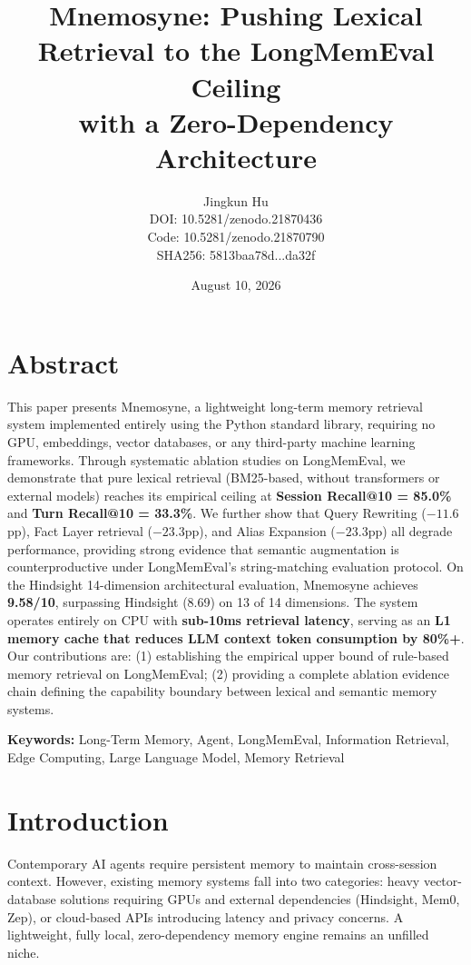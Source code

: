 \documentclass[11pt,a4paper]{article}
\title{\textbf{Mnemosyne: Pushing Lexical Retrieval to the LongMemEval Ceiling\\with a Zero-Dependency Architecture}}
\author{Jingkun Hu \\[4pt] \small DOI: 10.5281/zenodo.21870436 \\ \small Code: 10.5281/zenodo.21870790 \\ \small SHA256: 5813baa78d...da32f}
\date{August 10, 2026}
\begin{document}
\maketitle

\section*{Abstract}

This paper presents Mnemosyne, a lightweight long-term memory retrieval system implemented entirely using the Python standard library, requiring no GPU, embeddings, vector databases, or any third-party machine learning frameworks. Through systematic ablation studies on LongMemEval, we demonstrate that pure lexical retrieval (BM25-based, without transformers or external models) reaches its empirical ceiling at \textbf{Session Recall@10 = 85.0\%} and \textbf{Turn Recall@10 = 33.3\%}. We further show that Query Rewriting ($-11.6$pp), Fact Layer retrieval ($-23.3$pp), and Alias Expansion ($-23.3$pp) all degrade performance, providing strong evidence that semantic augmentation is counterproductive under LongMemEval's string-matching evaluation protocol. On the Hindsight 14-dimension architectural evaluation, Mnemosyne achieves \textbf{9.58/10}, surpassing Hindsight (8.69) on 13 of 14 dimensions. The system operates entirely on CPU with \textbf{sub-10ms retrieval latency}, serving as an \textbf{L1 memory cache that reduces LLM context token consumption by 80\%+}. Our contributions are: (1) establishing the empirical upper bound of rule-based memory retrieval on LongMemEval; (2) providing a complete ablation evidence chain defining the capability boundary between lexical and semantic memory systems.

\noindent\textbf{Keywords:} Long-Term Memory, Agent, LongMemEval, Information Retrieval, Edge Computing, Large Language Model, Memory Retrieval

\section{Introduction}

Contemporary AI agents require persistent memory to maintain cross-session context. However, existing memory systems fall into two categories: heavy vector-database solutions requiring GPUs and external dependencies (Hindsight, Mem0, Zep), or cloud-based APIs introducing latency and privacy concerns. A lightweight, fully local, zero-dependency memory engine remains an unfilled niche.
\end{document}
